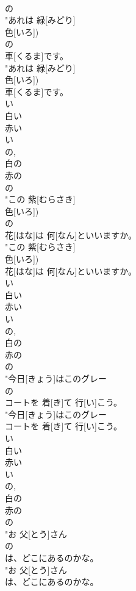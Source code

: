 \documentclass[8pt]{extreport}
\begin{document}
\begin{CJK}{UTF8}{min}
\\	の
\\	"あれは 緑[みどり]
\\	色[いろ])
\\	の
\\	車[くるま]です。
\\	"あれは 緑[みどり]
\\	色[いろ])
\\	車[くるま]です。
\\	い 
\\	白い 
\\	赤い 
\\	い 
\\	の, 
\\	白の 
\\	赤の	
\\	の
\\	"この 紫[むらさき]
\\	色[いろ])
\\	の
\\	花[はな]は 何[なん]といいますか。
\\	"この 紫[むらさき]
\\	色[いろ])
\\	花[はな]は 何[なん]といいますか。
\\	い 
\\	白い 
\\	赤い 
\\	い 
\\	の, 
\\	白の 
\\	赤の	
\\	の
\\	"今日[きょう]はこのグレー
\\	の
\\	コートを 着[き]て 行[い]こう。
\\	"今日[きょう]はこのグレー
\\	コートを 着[き]て 行[い]こう。
\\	い 
\\	白い 
\\	赤い 
\\	い 
\\	の, 
\\	白の 
\\	赤の	
\\	の
\\	"お 父[とう]さん
\\	の
\\	は、どこにあるのかな。
\\	"お 父[とう]さん
\\	は、どこにあるのかな。

\end{CJK}
\end{document}
